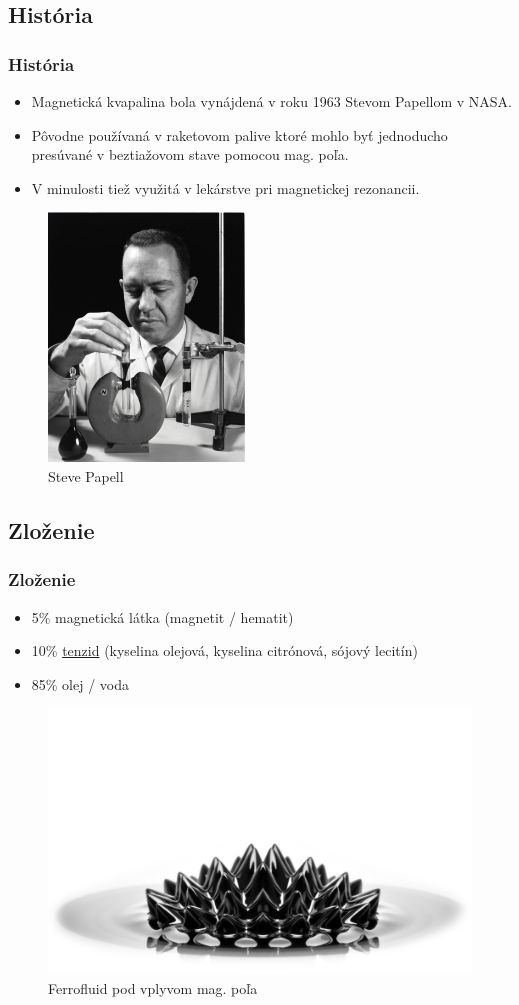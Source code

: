 \documentclass[dvipsnames]{beamer}
\begin{document}
\begin{frame}
	\section{História}
	\frametitle{História}
	\begin{itemize}
		\item Magnetická kvapalina bola vynájdená v roku 1963 Stevom Papellom v NASA.
		\item Pôvodne používaná v raketovom palive ktoré mohlo byť jednoducho presúvané v beztiažovom stave pomocou mag. poľa.
		\item V minulosti tiež využitá v lekárstve pri magnetickej rezonancii.
	\end{itemize}
	\begin{figure}
		\includegraphics[scale=.45]{steve.png}
		\caption{Steve Papell}
	\end{figure}
\end{frame}
\begin{frame}
	\section{Zloženie}
	\frametitle{Zloženie}
	\begin{itemize}
		\item 5\% magnetická látka (magnetit / hematit)
		\item 10\% \hyperlink{surfactantforgorurstupidbish}{tenzid} (kyselina olejová, kyselina citrónová, sójový lecitín)
		\item 85\% olej / voda

	\end{itemize}
	\begin{figure}
		\includegraphics[scale=.2]{ferro2}
		\caption{Ferrofluid pod vplyvom mag. poľa}
	\end{figure}
\end{frame}
\end{document}
